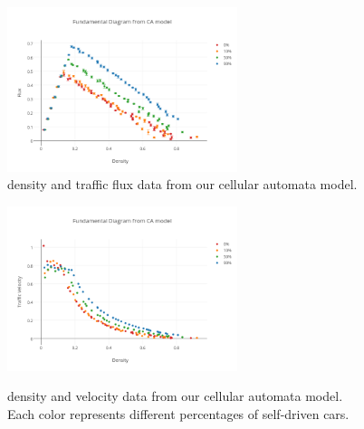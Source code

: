 \begin{figure}[h]
\centering
\includegraphics[width=0.6\textwidth]{img/flow-plot.png}\\
\caption{density and traffic flux data from our cellular automata model.}
\label{fig:flow-plot}

\centering
\includegraphics[width=0.6\textwidth]{img/velocity-plot.png}\\
\caption{density and velocity data from our cellular automata model.\\Each color represents different percentages of self-driven cars.}
\label{fig:vel-plot}
\end{figure}